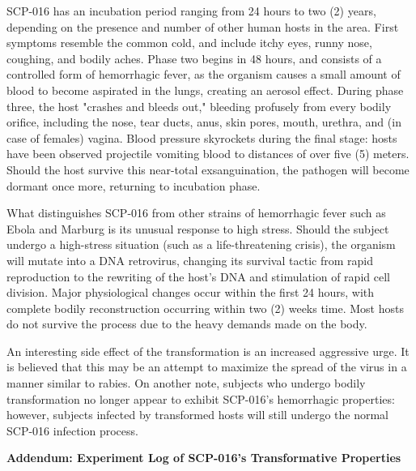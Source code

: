 SCP-016 has an incubation period ranging from 24 hours to two (2) years, depending on the presence and number of other human hosts in the area. First symptoms resemble the common cold, and include itchy eyes, runny nose, coughing, and bodily aches. Phase two begins in 48 hours, and consists of a controlled form of hemorrhagic fever, as the organism causes a small amount of blood to become aspirated in the lungs, creating an aerosol effect. During phase three, the host "crashes and bleeds out," bleeding profusely from every bodily orifice, including the nose, tear ducts, anus, skin pores, mouth, urethra, and (in case of females) vagina. Blood pressure skyrockets during the final stage: hosts have been observed projectile vomiting blood to distances of over five (5) meters. Should the host survive this near-total exsanguination, the pathogen will become dormant once more, returning to incubation phase.

What distinguishes SCP-016 from other strains of hemorrhagic fever such as Ebola and Marburg is its unusual response to high stress. Should the subject undergo a high-stress situation (such as a life-threatening crisis), the organism will mutate into a DNA retrovirus, changing its survival tactic from rapid reproduction to the rewriting of the host's DNA and stimulation of rapid cell division. Major physiological changes occur within the first 24 hours, with complete bodily reconstruction occurring within two (2) weeks time. Most hosts do not survive the process due to the heavy demands made on the body.

An interesting side effect of the transformation is an increased aggressive urge. It is believed that this may be an attempt to maximize the spread of the virus in a manner similar to rabies. On another note, subjects who undergo bodily transformation no longer appear to exhibit SCP-016's hemorrhagic properties: however, subjects infected by transformed hosts will still undergo the normal SCP-016 infection process.

\begin{flushleft}
\textbf{Addendum: Experiment Log of SCP-016's Transformative Properties}
\end{flushleft}

